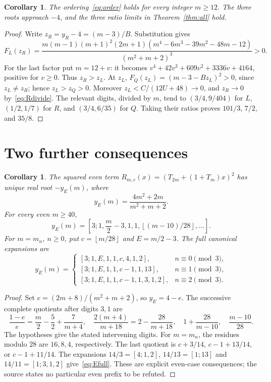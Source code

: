 \documentclass[11pt]{article}
\newtheorem{corollary}[theorem]{Corollary}
\newcommand{\floor}[1]{\left\lfloor #1\right\rfloor}
\begin{document}
\begin{corollary}\label{cor:order}
The ordering~\eqref{eq:order} holds for every integer $m\ge12$.
The three roots approach $-4$, and the three ratio limits in
Theorem~\ref{thm:all} hold.
\end{corollary}
\begin{proof}
Write $z_R=y_R-4=(m-3)/B$. Substitution gives
\[
 F_L(z_R)=\frac{m(m-1)(m+1)^2(2m+1)
 (m^4-6m^3-39m^2-48m-12)}{(m^2+m+2)^3}>0.
\]
For the last factor put $m=12+v$: it becomes
$v^4+42v^3+609v^2+3336v+4164$, positive for $v\ge0$.
Thus $z_R>z_L$. At $z_L$,
$F_Q(z_L)=(m-3-Bz_L)^2>0$, since $z_L\ne z_R$; hence $z_L>z_Q>0$.
Moreover $z_L<C/(12U+48)\to0$, and $z_R\to0$ by~\eqref{eq:Rdivide}.
The relevant digits, divided by $m$, tend to
$(3/4,9/404)$ for $L$, $(1/2,1/7)$ for $R$, and $(3/4,6/35)$ for $Q$.
Taking their ratios proves $101/3$, $7/2$, and $35/8$.
\end{proof}

\section{Two further consequences}
\begin{corollary}\label{cor:even}
The squared even term $R_{m,e}(x)=(T_{2m}+(1+T_m)x)^2$ has unique real root
$-y_E(m)$, where
\[
 y_E(m)=\frac{4m^2+2m}{m^2+m+2}.
\]
For every even $m\ge40$,
\[
 y_E(m)=\left[3;1,\frac m2-3,1,1,\floor{(m-10)/28},\ldots\right].
\]
For $m=m_n$, $n\ge0$, put $c=\floor{m/28}$ and $E=m/2-3$.
The full canonical expansions are
\begin{equation}\label{eq:Efull}
 y_E(m)=\begin{cases}
 [3;1,E,1,1,c,4,1,2],&n\equiv0\pmod3,\\
 [3;1,E,1,1,c-1,1,13],&n\equiv1\pmod3,\\
 [3;1,E,1,1,c-1,1,3,1,2],&n\equiv2\pmod3.
 \end{cases}
\end{equation}
\end{corollary}
\begin{proof}
Set $e=(2m+8)/(m^2+m+2)$, so $y_E=4-e$. The successive complete
quotients after digits $3,1$ are
\[
 \frac{1-e}{e}=\frac m2-\frac52+\frac7{m+4},\quad
 \frac{2(m+4)}{m+18}=2-\frac{28}{m+18},\quad
 1+\frac{28}{m-10},\quad \frac{m-10}{28}.
\]
The hypotheses give the stated intervening digits. For $m=m_n$, the
residues modulo $28$ are $16,8,4$, respectively. The last quotient is
$c+3/14$, $c-1+13/14$, or $c-1+11/14$.
The expansions $14/3=[4;1,2]$, $14/13=[1;13]$ and
$14/11=[1;3,1,2]$ give~\eqref{eq:Efull}.
These are explicit even-case consequences; the source states no particular
even prefix to be refuted.
\end{proof}
\end{document}
